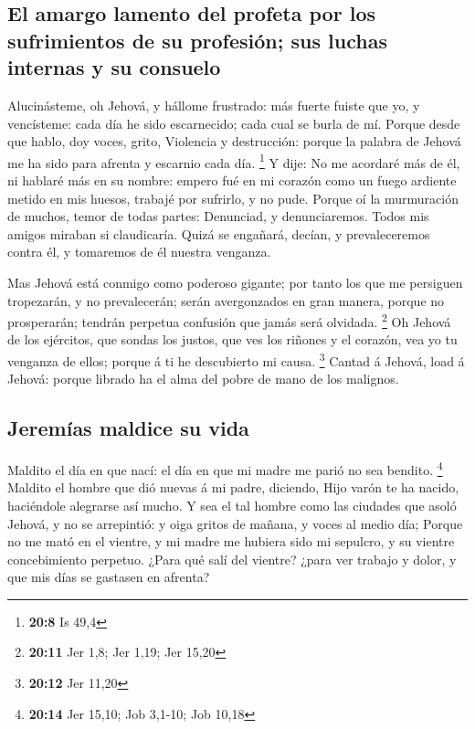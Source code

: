 \hypertarget{el-amargo-lamento-del-profeta-por-los-sufrimientos-de-su-profesiuxf3n-sus-luchas-internas-y-su-consuelo}{%
\subsection{El amargo lamento del profeta por los sufrimientos de su
profesión; sus luchas internas y su
consuelo}\label{el-amargo-lamento-del-profeta-por-los-sufrimientos-de-su-profesiuxf3n-sus-luchas-internas-y-su-consuelo}}

 Alucinásteme, oh Jehová, y hállome frustrado: más fuerte
fuiste que yo, y vencísteme: cada día he sido escarnecido; cada cual se
burla de mí.  Porque desde que hablo, doy voces, grito,
Violencia y destrucción: porque la palabra de Jehová me ha sido para
afrenta y escarnio cada día. \footnote{\textbf{20:8} Is 49,4}
 Y dije: No me acordaré más de él, ni hablaré más en su
nombre: empero fué en mi corazón como un fuego ardiente metido en mis
huesos, trabajé por sufrirlo, y no pude.  Porque oí la
murmuración de muchos, temor de todas partes: Denunciad, y
denunciaremos. Todos mis amigos miraban si claudicaría. Quizá se
engañará, decían, y prevaleceremos contra él, y tomaremos de él nuestra
venganza.

 Mas Jehová está conmigo como poderoso gigante; por tanto
los que me persiguen tropezarán, y no prevalecerán; serán avergonzados
en gran manera, porque no prosperarán; tendrán perpetua confusión que
jamás será olvidada. \footnote{\textbf{20:11} Jer 1,8; Jer 1,19; Jer
  15,20}  Oh Jehová de los ejércitos, que sondas los
justos, que ves los riñones y el corazón, vea yo tu venganza de ellos;
porque á ti he descubierto mi causa. \footnote{\textbf{20:12} Jer 11,20}
 Cantad á Jehová, load á Jehová: porque librado ha el
alma del pobre de mano de los malignos.

\hypertarget{jeremuxedas-maldice-su-vida}{%
\subsection{Jeremías maldice su
vida}\label{jeremuxedas-maldice-su-vida}}

 Maldito el día en que nací: el día en que mi madre me
parió no sea bendito. \footnote{\textbf{20:14} Jer 15,10; Job 3,1-10;
  Job 10,18}  Maldito el hombre que dió nuevas á mi
padre, diciendo, Hijo varón te ha nacido, haciéndole alegrarse así
mucho.  Y sea el tal hombre como las ciudades que asoló
Jehová, y no se arrepintió: y oiga gritos de mañana, y voces al medio
día;  Porque no me mató en el vientre, y mi madre me
hubiera sido mi sepulcro, y su vientre concebimiento perpetuo.
 ¿Para qué salí del vientre? ¿para ver trabajo y dolor, y
que mis días se gastasen en afrenta?

